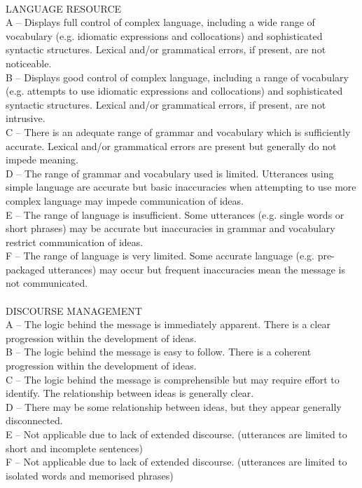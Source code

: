 \documentclass{report}
\begin{document}
\begin{tcolorbox}[breakable, colback=white, colframe=black, title=Rubric-based Question Set Batch Prompt]
\\
LANGUAGE RESOURCE\\
A -- Displays full control of complex language, including a wide range of vocabulary (e.g. idiomatic expressions and collocations) and sophisticated syntactic structures. Lexical and/or grammatical errors, if present, are not noticeable.\\
B -- Displays good control of complex language, including a range of vocabulary (e.g. attempts to use idiomatic expressions and collocations) and sophisticated syntactic structures. Lexical and/or grammatical errors, if present, are not intrusive.\\
C -- There is an adequate range of grammar and vocabulary which is sufficiently accurate. Lexical and/or grammatical errors are present but generally do not impede meaning.\\
D -- The range of grammar and vocabulary used is limited. Utterances using simple language are accurate but basic inaccuracies when attempting to use more complex language may impede communication of ideas.\\
E -- The range of language is insufficient. Some utterances (e.g. single words or short phrases) may be accurate but inaccuracies in grammar and vocabulary restrict communication of ideas.\\
F -- The range of language is very limited. Some accurate language (e.g. pre-packaged utterances) may occur but frequent inaccuracies mean the message is not communicated.\\
\\
DISCOURSE MANAGEMENT\\
A -- The logic behind the message is immediately apparent. There is a clear progression within the development of ideas.\\
B -- The logic behind the message is easy to follow. There is a coherent progression within the development of ideas.\\
C -- The logic behind the message is comprehensible but may require effort to identify. The relationship between ideas is generally clear.\\
D -- There may be some relationship between ideas, but they appear generally disconnected.\\
E -- Not applicable due to lack of extended discourse. (utterances are limited to short and incomplete sentences)\\
F -- Not applicable due to lack of extended discourse. (utterances are limited to isolated words and memorised phrases)\\

\end{tcolorbox}
\end{document}
